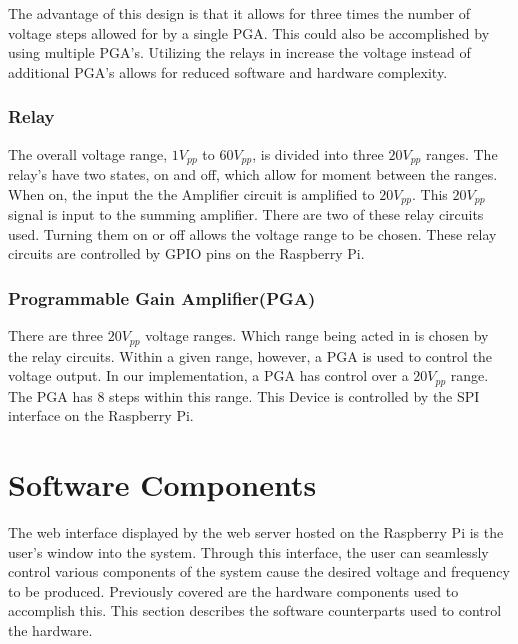 \documentclass{article}	%
\begin{document}
\begin{multicols}{2}
The advantage of this design is that
it allows for three times the number of voltage steps
allowed for by a single PGA.
This could also be accomplished by using multiple PGA's.
Utilizing the relays in increase the voltage instead of additional PGA's
allows for reduced software and hardware complexity.

\subsubsection{Relay}
The overall voltage range,
$1V_{pp}$ to $60V_{pp}$,
is divided into three $20V_{pp}$ ranges.
The relay's have two states,
on and off,
which allow for moment between the ranges.
When on,
the input the the Amplifier circuit is amplified to $20V_{pp}$.
This $20V_{pp}$ signal is input to the summing amplifier.
There are two of these relay circuits used.
Turning them on or off allows the voltage range to be chosen.
These relay circuits are controlled by 
GPIO pins on the Raspberry Pi.

\subsubsection{Programmable Gain Amplifier(PGA)}
There are three $20V_{pp}$ voltage ranges.
Which range being acted in is chosen by the relay circuits.
Within a given range,
however,
a PGA is used to control the voltage output.
In our implementation,
a PGA has control over a $20V_{pp}$ range.
The PGA has 8 steps within this range.
This Device is controlled by 
the SPI interface on the Raspberry Pi.



\section{Software Components}
The web interface displayed by
the web server hosted on the Raspberry Pi
is the user's window into the system.
Through this interface,
the user can seamlessly control various
components of the system cause 
the desired voltage and frequency 
to be produced.
Previously covered are
the hardware components used to accomplish this.
This section describes the software counterparts
used to control the hardware.


\end{multicols}
\end{document}
